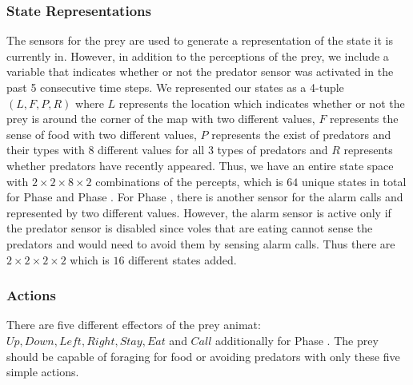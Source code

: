 \documentclass[10pt,conference,letterpaper,doublecolumn]{IEEEtran}
\begin{document}
\subsubsection{State Representations}
The sensors for the prey are used to generate a representation of the state it is currently in. However, in addition to the perceptions of the prey, we include a variable that indicates whether or not the predator sensor was activated in the past 5 consecutive time steps. We represented our states as a 4-tuple $(L, F, P, R)$ where $L$ represents the location which indicates whether or not the prey is around the corner of the map with two different values, $F$ represents the sense of food with two different values, $P$ represents the exist of predators and their types with $8$ different values for all $3$ types of predators and $R$ represents whether predators have recently appeared. Thus, we have an entire state space with $2 \times 2 \times 8 \times 2$ combinations of the percepts, which is $64$ unique states in total for Phase \uppercase\expandafter{} and Phase \uppercase\expandafter{}. 
For Phase \uppercase\expandafter{}, there is another sensor for the alarm calls and represented by two different values. However, the alarm sensor is active only if the predator sensor is disabled since voles that are eating cannot sense the predators and would need to avoid them by sensing alarm calls. Thus there are $2 \times 2 \times 2 \times 2$ which is $16$ different states added.

\subsubsection{Actions}
There are five different effectors of the prey animat: $Up, Down, Left, Right, Stay, Eat$ and $Call$ additionally for Phase \uppercase\expandafter{}. The prey should be capable of foraging for food or avoiding predators with only these five simple actions.
\end{document}
